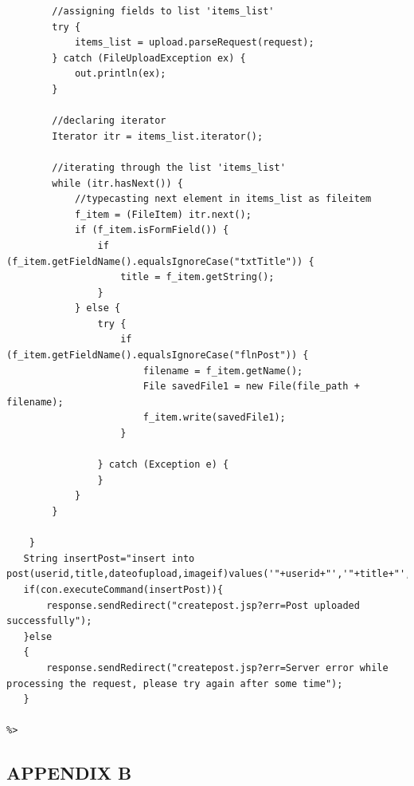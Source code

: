 \documentclass[a4paper,12pt]{article}
\begin{document}
\begin{verbatim}
        //assigning fields to list 'items_list'
        try {
            items_list = upload.parseRequest(request);
        } catch (FileUploadException ex) {
            out.println(ex);
        }

        //declaring iterator
        Iterator itr = items_list.iterator();

        //iterating through the list 'items_list'
        while (itr.hasNext()) {
            //typecasting next element in items_list as fileitem
            f_item = (FileItem) itr.next();
            if (f_item.isFormField()) {
                if (f_item.getFieldName().equalsIgnoreCase("txtTitle")) {
                    title = f_item.getString();
                }
            } else {
                try {
                    if (f_item.getFieldName().equalsIgnoreCase("flnPost")) {
                        filename = f_item.getName();
                        File savedFile1 = new File(file_path + filename);
                        f_item.write(savedFile1);
                    }

                } catch (Exception e) {
                }
            }
        }

    }
   String insertPost="insert into post(userid,title,dateofupload,imageif)values('"+userid+"','"+title+"','"+dateofupload+"','"+filename+"')";
   if(con.executeCommand(insertPost)){
       response.sendRedirect("createpost.jsp?err=Post uploaded successfully");
   }else
   {
       response.sendRedirect("createpost.jsp?err=Server error while processing the request, please try again after some time");
   }

%>
\end{verbatim}
\newpage
\subsection{APPENDIX B} 
\end{document}
